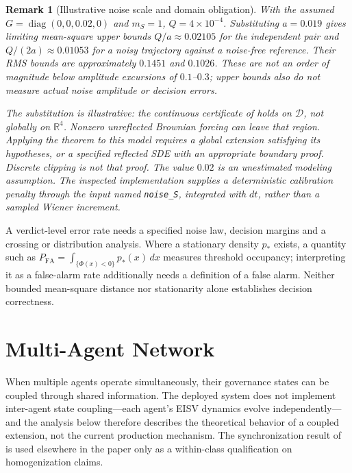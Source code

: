 \documentclass[11pt,twocolumn]{article}
\newtheorem{remark}[theorem]{Remark}
\begin{document}
\begin{remark}[Illustrative noise scale and domain obligation]
With the assumed $G=\operatorname{diag}(0,0,0.02,0)$ and $m_S=1$,
$Q=4\times10^{-4}$. Substituting $a=0.019$ gives limiting
mean-square upper bounds $Q/a\approx0.02105$ for the independent
pair and $Q/(2a)\approx0.01053$ for a noisy trajectory against
a noise-free reference. Their RMS bounds are approximately
$0.1451$ and $0.1026$. These are not an order of magnitude below
amplitude excursions of $0.1$--$0.3$; upper bounds also do not
measure actual noise amplitude or decision errors.

The substitution is illustrative: the continuous certificate of
 holds on $\mathcal D$, not globally
on $\mathbb R^4$. Nonzero unreflected Brownian forcing can leave
that region. Applying the theorem to this model requires a global
extension satisfying its hypotheses, or a specified reflected SDE
with an appropriate boundary proof. Discrete clipping is not that
proof. The value $0.02$ is an unestimated modeling assumption.
The inspected implementation supplies a deterministic calibration
penalty through the input named \texttt{noise\_S}, integrated with
$dt$, rather than a sampled Wiener increment.
\end{remark}

A verdict-level error rate needs a specified noise law, decision
margins and a crossing or distribution analysis. Where a stationary
density $p_* $ exists, a quantity such as
$P_{\mathrm{FA}}=\int_{\{\Phi(x)<0\}}p_*(x)\,dx$ measures threshold
occupancy; interpreting it as a false-alarm rate additionally needs
a definition of a false alarm. Neither bounded mean-square distance
nor stationarity alone establishes decision correctness.

\section{Multi-Agent Network}
\label{sec:network}

When multiple agents operate simultaneously, their governance
states can be coupled through shared information. The deployed
system does not implement inter-agent state coupling---each agent's
EISV dynamics evolve independently---and the analysis below
therefore describes the theoretical behavior of a coupled
extension, not the current production mechanism. The synchronization
result of  is used elsewhere in the paper only as
a within-class qualification on homogenization claims.
\end{document}
